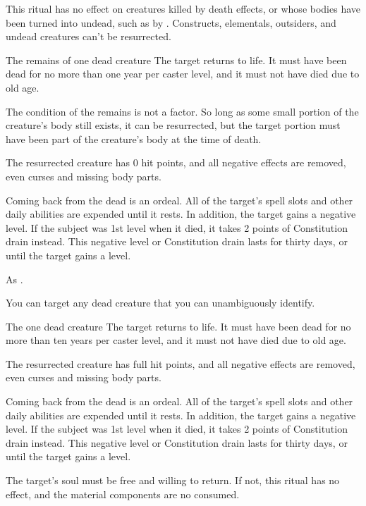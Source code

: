 This ritual has no effect on creatures killed by death effects, or whose bodies have been turned into undead, such as by . Constructs, elementals, outsiders, and undead creatures can't be resurrected.

\begin{spelltarget}{The remains of one dead creature}
    \spelleffect The target returns to life. It must have been dead for no more than one year per caster level, and it must not have died due to old age.

    The condition of the remains is not a factor. So long as some small portion of the creature's body still exists, it can be resurrected, but the target portion must have been part of the creature's body at the time of death. 

    The resurrected creature has 0 hit points, and all negative effects are removed, even curses and missing body parts.

    \par Coming back from the dead is an ordeal. All of the target's spell slots and other daily abilities are expended until it rests. In addition, the target gains a negative level. If the subject was 1st level when it died, it takes 2 points of Constitution drain instead. This negative level or Constitution drain lasts for thirty days, or until the target gains a level.
\end{spelltarget}
\spellnotes As .

\spellspecial You can target any dead creature that you can unambiguously identify.
\begin{spelltarget}{The one dead creature}
    \spelleffect The target returns to life. It must have been dead for no more than ten years per caster level, and it must not have died due to old age.

    The resurrected creature has full hit points, and all negative effects are removed, even curses and missing body parts.

    \par Coming back from the dead is an ordeal. All of the target's spell slots and other daily abilities are expended until it rests. In addition, the target gains a negative level. If the subject was 1st level when it died, it takes 2 points of Constitution drain instead. This negative level or Constitution drain lasts for thirty days, or until the target gains a level.
\end{spelltarget}
\spellnotes The target's soul must be free and willing to return. If not, this ritual has no effect, and the material components are no consumed.


